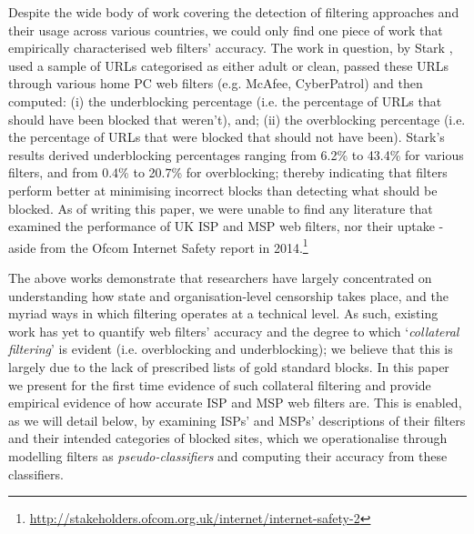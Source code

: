 \documentclass{bmcart}
\begin{document}
Despite the wide body of work covering the detection of filtering approaches and their usage across various countries, we could only find one piece of work that empirically characterised web filters' accuracy.
The work in question, by Stark \cite{stark2007effectiveness}, used a sample of URLs categorised as either adult or clean, passed these URLs through various home PC web filters (e.g. McAfee, CyberPatrol) and then computed: (i) the underblocking percentage (i.e. the percentage of URLs that should have been blocked that weren't), and; (ii) the overblocking percentage (i.e. the percentage of URLs that were blocked that should not have been).
Stark's results derived underblocking percentages ranging from 6.2\% to 43.4\%  for various filters, and from 0.4\% to 20.7\% for overblocking; thereby indicating that filters perform better at minimising incorrect blocks than detecting what should be blocked.
As of writing this paper, we were unable to find any literature that examined the performance of UK ISP and MSP web filters, nor their uptake - aside from the Ofcom Internet Safety report in 2014.\footnote{\url{http://stakeholders.ofcom.org.uk/internet/internet-safety-2}}

The above works demonstrate that researchers have largely concentrated on understanding how state and organisation-level censorship takes place, and the myriad ways in which filtering operates at a technical level.
As such, existing work has yet to quantify web filters' accuracy and the degree to which `\textit{collateral filtering}' is evident (i.e. overblocking and underblocking); we believe that this is largely due to the lack of prescribed lists of gold standard blocks.
In this paper we present for the first time evidence of such collateral filtering and provide empirical evidence of how accurate ISP and MSP web filters are.
This is enabled, as we will detail below, by examining ISPs' and MSPs' descriptions of their filters and their intended categories of blocked sites, which we operationalise through modelling filters as \textit{pseudo-classifiers} and computing their accuracy from these classifiers.
\end{document}
